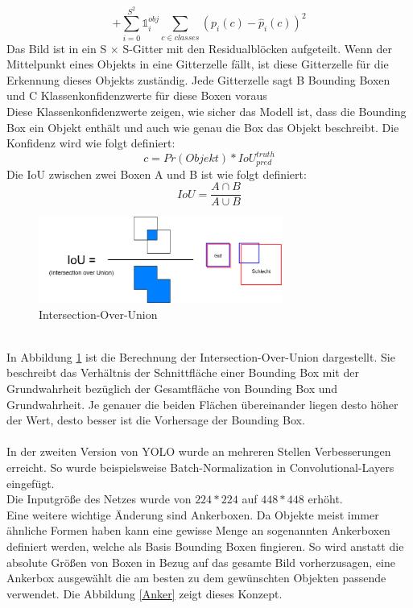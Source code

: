 \documentclass[conference]{IEEEtran}
\begin{document}
	\[ + \sum_{i=0}^{S^2} \mathbb{1}_{i}^{obj} \sum_{c \in classes} (p_i(c) - \hat{p}_i(c))^2 \]
	Das Bild ist in ein S × S-Gitter mit den Residualblöcken aufgeteilt. Wenn der Mittelpunkt eines Objekts in eine Gitterzelle fällt, ist diese Gitterzelle für die Erkennung dieses Objekts zuständig. Jede Gitterzelle sagt B Bounding Boxen und C Klassenkonfidenzwerte für diese Boxen voraus \cite{b1}\\
	Diese Klassenkonfidenzwerte zeigen, wie sicher das Modell ist, dass die Bounding Box ein Objekt enthält und auch wie genau die Box das Objekt beschreibt. Die Konfidenz wird wie folgt definiert:
	\[ c = Pr(Objekt) * IoU_{pred}^{truth} \]
	Die IoU zwischen zwei Boxen A und B ist wie folgt definiert:
	\[ IoU = \frac{A \cap B}{A \cup B} \]
	\begin{figure}[h]
		\begin{center}
			\includegraphics[width=8cm]{Media/Iou.png}
			\caption{Intersection-Over-Union}
			\label{IoU}
		\end{center}
	\end{figure}\\
	In Abbildung \ref{IoU} ist die Berechnung der Intersection-Over-Union dargestellt. Sie beschreibt das Verhältnis der Schnittfläche einer Bounding Box mit der Grundwahrheit bezüglich der Gesamtfläche von Bounding Box und Grundwahrheit. Je genauer die beiden Flächen übereinander liegen desto höher der Wert, desto besser ist die Vorhersage der Bounding Box.\\
	\\
	In der zweiten Version von YOLO \cite{b3} wurde an mehreren Stellen Verbesserungen erreicht. So wurde beispielsweise Batch-Normalization in Convolutional-Layers eingefügt.\\
	Die Inputgröße des Netzes wurde von $224*224$ auf $448*448$ erhöht.\\
	Eine weitere wichtige Änderung sind Ankerboxen. Da Objekte meist immer ähnliche Formen haben kann eine gewisse Menge an sogenannten Ankerboxen definiert werden, welche als Basis Bounding Boxen fingieren. So wird anstatt die absolute Größen von Boxen in Bezug auf das gesamte Bild vorherzusagen, eine Ankerbox ausgewählt die am besten zu dem gewünschten Objekten passende verwendet. Die Abbildung \ref{Anker} zeigt dieses Konzept.
\end{document}
